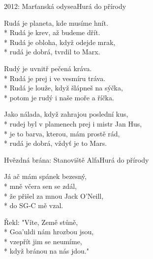\documentclass[10.5pt]{book}
\begin{document}
\begin{poem}{2012: Marťanská odysea}{Hurá do přírody}

\settowidth{\versewidth}{rudej byl v plamenech prej i mistr Jan Hus,}

Rudá je planeta, kde musíme hnít.\\*
Rudá je krev, až budeme dřít.\\*
Rudá je obloha, když odejde mrak,\\*
rudá je dobrá, tvrdil to Marx.

Rudý je uvnitř pečená kráva.\\*
Rudá je prej i ve vesmíru tráva.\\*
Rudá je louže, když šlápneš na sýčka,\\*
potom je rudý i naše moře a říčka.

Jako nálada, když zahrajou poslední kus,\\*
rudej byl v plamenech prej i mistr Jan Hus,\\*
je to barva, kterou, mám prostě rád,\\*
rudá je dobrá, vždyť je to Mars.

\end{poem}

\begin{poem}{Hvězdná brána: Stanoviště Alfa}{Hurá do přírody}

\settowidth{\versewidth}{že přišel za mnou Jack O'Neill,}

Já ač mám spánek bezesný,\\*
mně včera sen se zdál,\\*
že přišel za mnou Jack O'Neill,\\*
do SG-C mě vzal. 

Řekl: "Víte, Země stůně,\\*
Goa'uldi nám hrozbou jsou,\\*
vzepřít jim se neumíme,\\*
když bránou na nás jdou."

\end{poem}
\end{document}
